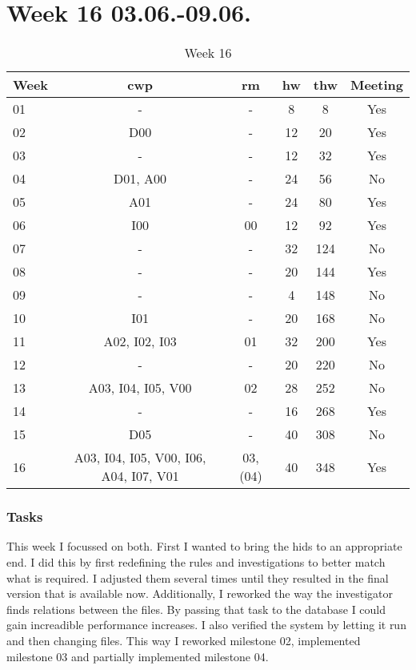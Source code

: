 \section{Week 16 03.06.-09.06.}
\label{sec:journal:week16}


\begin{table}[!ht]
    \begin{center}
        \caption{Week 16}
        \label{tab:journal:week16}
        \begin{tabular}{l|c|c|c|c|c}
            \textbf{Week} & \textbf{\gls{cwp}} & \textbf{\gls{rm}} & \textbf{\gls{hw}} & \textbf{\gls{thw}} & \textbf{Meeting}\\
        \hline
        01 & - & - & 8 & 8 & Yes \\
        02 & D00 & - & 12 & 20 & Yes \\
        03 & - & - & 12 & 32 & Yes \\
        04 & D01, A00 & - & 24 & 56 & No \\
        05 & A01 & - & 24 & 80 & Yes \\
        06 & I00 & 00 & 12 & 92 & Yes \\
        07 & - & - & 32 & 124 & No \\
        08 & - & - & 20 & 144 & Yes \\
        09 & - & - & 4 & 148 & No \\
        10 & I01 & - & 20 & 168 & No \\
        11 & A02, I02, I03 & 01 & 32 & 200 & Yes \\
        12 & - & - & 20 & 220 & No \\
        13 & A03, I04, I05, V00 & 02 & 28 & 252 & No \\
        14 & - & - & 16 & 268 & Yes \\
        15 & D05 & - & 40 & 308 & No \\
        16 & A03, I04, I05, V00, I06, A04, I07, V01 & 03, (04) & 40 & 348 & Yes \\
        \end{tabular}
    \end{center}
\end{table}

\subsubsection{Tasks}

This week I focussed on both. First I wanted to bring the \gls{hids} to an appropriate end. I did this by first redefining the rules and investigations to better match what is required. I adjusted them several times until they resulted in the final version that is available now. Additionally, I reworked the way the investigator finds relations between the files. By passing that task to the database I could gain increadible performance increases. I also verified the system by letting it run and then changing files. This way I reworked milestone 02, implemented milestone 03 and partially implemented milestone 04. 

